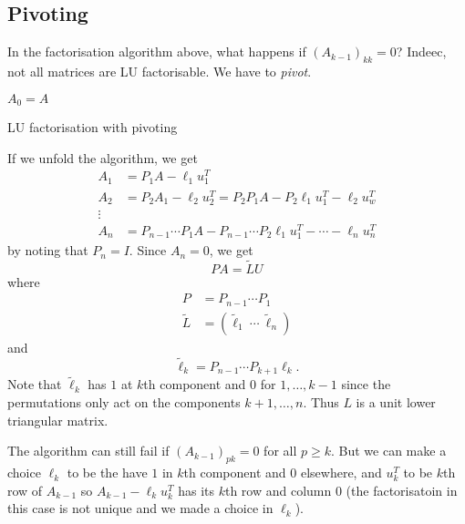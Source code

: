 \documentclass[a4paper]{article}
\begin{document}
\subsection{Pivoting}

In the factorisation algorithm above, what happens if \((A_{k - 1})_{kk} = 0\)? Indeec, not all matrices are LU factorisable. We have to \emph{pivot}.

\begin{algorithm}
  \(A_0 = A\)\;
  \caption{LU factorisation with pivoting}
\end{algorithm}

If we unfold the algorithm, we get
\begin{align*}
  A_1 &= P_1A - \ell_1u_1^T \\
  A_2 &= P_2A_1 - \ell_2u_2^T = P_2P_1A - P_2\ell_1u_1^T - \ell_2u_w^T \\
  \vdots \\
  A_n &= P_{n - 1} \cdots P_1A - P_{n - 1} \cdots P_2 \ell_1 u_1^T - \cdots - \ell_nu_n^T
\end{align*}
by noting that \(P_n = I\). Since \(A_n = 0\), we get
\[
  PA = \tilde L U
\]
where
\begin{align*}
  P &= P_{n - 1} \cdots P_1 \\
  \tilde L &= (\tilde \ell_1 \  \cdots \  \tilde \ell_n)
\end{align*}
and
\[
  \tilde \ell_k = P_{n - 1} \cdots P_{k + 1} \ell_k.
\]
Note that \(\tilde \ell_k\) has \(1\) at \(k\)th component and \(0\) for \(1, \dots, k - 1\) since the permutations only act on the components \(k + 1, \dots, n\). Thus \(L\) is a unit lower triangular matrix.

\begin{note}
  The algorithm can still fail if \((A_{k - 1})_{pk} = 0\) for all \(p \geq k\). But we can make a choice \(\ell_k\) to be the have \(1 \) in \(k\)th component and \(0\) elsewhere, and \(u_k^T\) to be \(k\)th row of \(A_{k - 1}\) so \(A_{k - 1} - \ell_ku_k^T\) has its \(k\)th row and column \(0\) (the factorisatoin in this case is not unique and we made a choice in \(\ell_k\)).
\end{note}
\end{document}
